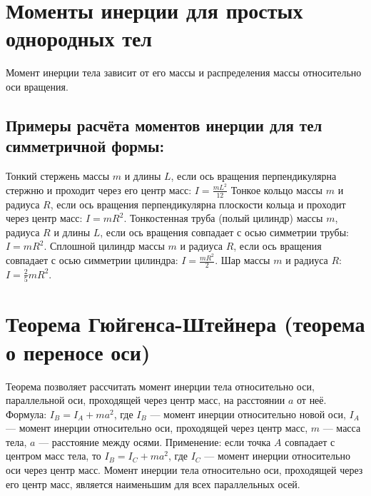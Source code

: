 \documentclass[a4paper]{article}
\begin{document}
	
	\section{Моменты инерции для простых однородных тел} 
	Момент инерции тела зависит от его массы и распределения массы относительно оси вращения. 
	\subsection*{Примеры расчёта моментов инерции для тел симметричной формы:}
	\begin{flushleft}
		Тонкий стержень массы $m$ и длины $L$, если ось вращения перпендикулярна стержню и проходит через его центр масс: $I = \frac{mL^2}{12}$ 
	\linebreak \linebreak
	Тонкое кольцо массы $m$ и радиуса $R$, если ось вращения перпендикулярна плоскости кольца и проходит через центр масс: $I = mR^2$.
	\linebreak \linebreak
	Тонкостенная труба (полый цилиндр) массы $m$, радиуса $R$ и длины $L$, если ось вращения совпадает с осью симметрии трубы: $I = mR^2$.
	\linebreak \linebreak
	Сплошной цилиндр массы $m$ и радиуса $R$, если ось вращения совпадает с осью симметрии цилиндра: $I = \frac{mR^2}{2}$.
	\linebreak \linebreak
	Шар массы $m$ и радиуса $R$: $I = \frac{2}{5}mR^2$.
	
\end{flushleft}
	\section{Теорема Гюйгенса-Штейнера (теорема о переносе оси)}
	\begin{flushleft}
		Теорема позволяет рассчитать момент инерции тела относительно оси, параллельной оси, проходящей через центр масс, на расстоянии $a$ от неё. \linebreak \linebreak
		Формула: $I_B = I_A + ma^2$, где $I_B$ — момент инерции относительно новой оси, $I_A$ — момент инерции относительно оси, проходящей через центр масс, $m$ — масса тела, $a$ — расстояние между осями. \linebreak \linebreak
		Применение: если точка $A$ совпадает с центром масс тела, то $I_B = I_C + ma^2$, где $I_C$ — момент инерции относительно оси через центр масс. Момент инерции тела относительно оси, проходящей через его центр масс, является наименьшим для всех параллельных осей.
	\end{flushleft}
	
	
\end{document}
